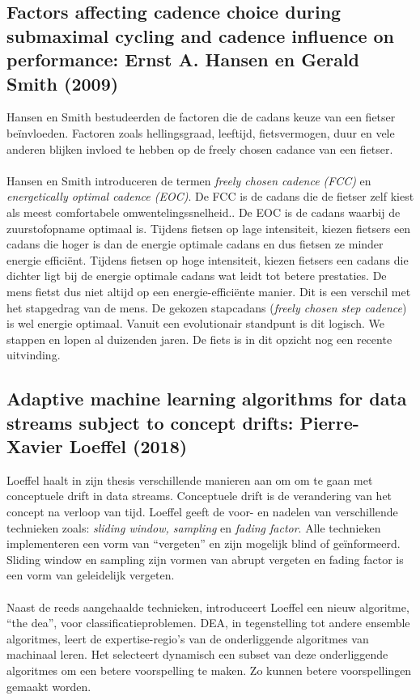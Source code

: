 \subsection{Factors affecting cadence choice during submaximal cycling and cadence influence on performance: Ernst A. Hansen en Gerald Smith (2009)}
Hansen en Smith bestudeerden de factoren die de cadans keuze van een fietser beïnvloeden. Factoren zoals hellingsgraad, leeftijd, fietsvermogen, duur en vele anderen blijken invloed te hebben op de freely chosen cadance van een fietser.
\\\\
Hansen en Smith introduceren de termen \textit{freely chosen cadence (FCC)} en \textit{energetically optimal cadence (EOC)}. De FCC is de cadans die de fietser zelf kiest als meest comfortabele omwentelingssnelheid.. De EOC is de cadans waarbij de zuurstofopname optimaal is. Tijdens fietsen op lage intensiteit, kiezen fietsers een cadans die hoger is dan de energie optimale cadans en dus fietsen ze minder energie efficiënt. Tijdens fietsen op hoge intensiteit, kiezen fietsers een cadans die dichter ligt bij de energie optimale cadans wat leidt tot betere prestaties. De mens fietst dus niet altijd op een energie-efficiënte manier. Dit is een verschil met het stapgedrag van de mens. De gekozen stapcadans (\textit{freely chosen step cadence}) is wel energie optimaal. Vanuit een evolutionair standpunt is dit logisch. We stappen en lopen al duizenden jaren. De fiets is in dit opzicht nog een recente uitvinding.

\subsection{Adaptive machine learning algorithms for data streams subject to concept drifts: Pierre-Xavier Loeffel (2018)}
Loeffel haalt in zijn thesis verschillende manieren aan om om te gaan met conceptuele drift in data streams. Conceptuele drift is de verandering van het concept na verloop van tijd. Loeffel geeft de voor- en nadelen van verschillende technieken zoals: \textit{sliding window, sampling} en \textit{fading factor}. Alle technieken implementeren een vorm van “vergeten” en zijn mogelijk blind of geïnformeerd. Sliding window en sampling zijn vormen van abrupt vergeten en fading factor is een vorm van geleidelijk vergeten.
\\\\
Naast de reeds aangehaalde technieken, introduceert Loeffel een nieuw algoritme, “the \gls{dea}”, voor classificatieproblemen. DEA, in tegenstelling tot andere ensemble algoritmes, leert de expertise-regio’s van de onderliggende algoritmes van machinaal leren. Het selecteert dynamisch een subset van deze onderliggende algoritmes om een betere voorspelling te maken. Zo kunnen betere voorspellingen gemaakt worden.
